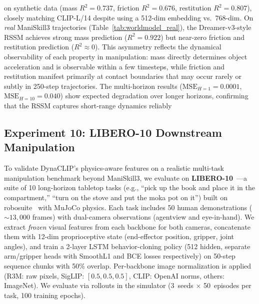 \documentclass{article}
\newcommand{\methodname}{DynaCLIP}
\begin{document}
on synthetic data (mass $R^2{=}0.737$, friction $R^2{=}0.676$, restitution $R^2{=}0.807$), closely matching CLIP-L/14 despite using a 512-dim embedding vs.\ 768-dim. On \emph{real} ManiSkill3 trajectories (Table~\ref{tab:worldmodel_real}), the Dreamer-v3-style RSSM achieves strong mass prediction ($R^2{=}0.922$) but near-zero friction and restitution prediction ($R^2{\approx}0$). This asymmetry reflects the dynamical observability of each property in manipulation: mass directly determines object acceleration and is observable within a few timesteps, while friction and restitution manifest primarily at contact boundaries that may occur rarely or subtly in 250-step trajectories. The multi-horizon results ($\text{MSE}_{H=1}{=}0.0001$, $\text{MSE}_{H=10}{=}0.040$) show expected degradation over longer horizons, confirming that the RSSM captures short-range dynamics reliably

\subsection{Experiment 10: LIBERO-10 Downstream Manipulation}
\label{sec:libero}

To validate \methodname{}'s physics-aware features on a realistic multi-task manipulation benchmark beyond ManiSkill3, we evaluate on \textbf{LIBERO-10}~\cite{liu2024libero}---a suite of 10 long-horizon tabletop tasks (e.g., ``pick up the book and place it in the compartment,'' ``turn on the stove and put the moka pot on it'') built on robosuite~\cite{zhu2020robosuite} with MuJoCo physics. Each task includes 50 human demonstrations (${\sim}13{,}000$ frames) with dual-camera observations (agentview and eye-in-hand). We extract \emph{frozen} visual features from each backbone for both cameras, concatenate them with 12-dim proprioceptive state (end-effector position, gripper, joint angles), and train a 2-layer LSTM behavior-cloning policy (512 hidden, separate arm/gripper heads with SmoothL1 and BCE losses respectively) on 50-step sequence chunks with 50\% overlap. Per-backbone image normalization is applied (R3M: raw pixels, SigLIP: $[0.5, 0.5, 0.5]$, CLIP: OpenAI norms, others: ImageNet). We evaluate via rollouts in the simulator (3~seeds $\times$ 50~episodes per task, 100 training epochs).
\end{document}
